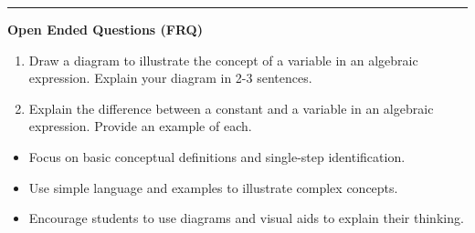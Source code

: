\documentclass[10pt]{article}
\begin{document}
\vspace{-0.2cm}
\hrule
\vspace{0.2cm}
\textbf{\small Open Ended Questions (FRQ)}
\begin{enumerate}[label=\textbf{Q\arabic*.}, start=9, itemsep=5pt, topsep=0pt]

  \item \small Draw a diagram to illustrate the concept of a variable in an algebraic expression. Explain your diagram in 2-3 sentences. \vspace{2cm}

  \item \small Explain the difference between a constant and a variable in an algebraic expression. Provide an example of each. \vspace{2cm}

\end{enumerate}

\vfill

\begin{tcolorbox}[colback=blue!5, colframe=mainblue!50, title=\small \textbf{Chef's Tips}, fonttitle=\bfseries, bottom=1mm]
\begin{itemize}[noitemsep, topsep=2pt, leftmargin=0.5cm]
  \item \scriptsize Focus on basic conceptual definitions and single-step identification.\item \scriptsize Use simple language and examples to illustrate complex concepts.\item \scriptsize Encourage students to use diagrams and visual aids to explain their thinking.
\end{itemize}
\end{tcolorbox}
\end{document}

